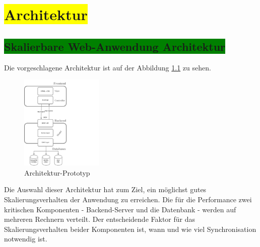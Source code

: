 \chapter{\colorbox{yellow}{Architektur}}

\section{\colorbox{green}{Skalierbare Web-Anwendung Architektur}}

Die vorgeschlagene Architektur ist auf der Abbildung \ref{img:architectureMyApp} zu sehen.


\begin{figure}[H]
\centering
\includegraphics[trim = 0mm 0mm 0mm 0mm, clip, width=0.35\textwidth]{resources/architectureMyAppWithoutFrameworks}
\caption[Architektur-Prototyp]{Architektur-Prototyp}
\label{img:architectureMyApp}
\end{figure}

Die Auswahl dieser Architektur hat zum Ziel, ein möglichst gutes Skalierungsverhalten der Anwendung zu erreichen. Die für die Performance zwei kritischen Komponenten - Backend-Server und die Datenbank - werden auf mehreren Rechnern verteilt. Der entscheidende Faktor für das Skalierungsverhalten beider Komponenten ist, wann und wie viel Synchronisation notwendig ist. 

